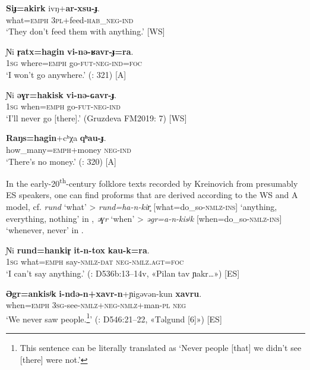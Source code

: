 \documentclass[output=paper,colorlinks,citecolor=brown]{langscibook}
\begin{document}
\ea\label{ex:niv:126}
    \gll \textbf{Siɟ=akirk} ivŋ+\textbf{ar-xsu-ɟ}. \\ 
         what=\textsc{emph} 3\textsc{pl}+feed-\textsc{hab\_neg{}-ind} \\
    \glt ‘They don’t feed them with anything.’ \citep[247]{Panfilov1965} [WS]
\z 

\ea\label{ex:niv:127}
    \gll Ɲi \textbf{r̥atx=hagin} \textbf{vi-nə{}-ʁavr-ɟ=ra}. \\ 
         \textsc{1sg} where=\textsc{emph} go-\textsc{fut-neg-ind=foc} \\
    \glt ‘I won’t go anywhere.’ (\citealt{SaveljevaTaksami1970}: 321) [A]
\z 

\ea\label{ex:niv:128}
    \gll Ɲi \textbf{əɣr=hakisk} \textbf{vi-nə-ɢavr-ɟ}. \\ 
         \textsc{1sg} when=\textsc{emph} go-\textsc{fut-neg-ind} \\
    \glt ‘I’ll never go [there].’ (Gruzdeva FM2019: 7) [WS]
\z 

\ea\label{ex:niv:129}
    \gll \textbf{Raŋs=hagin}+cʰχa \textbf{qʰau-ɟ}. \\ 
         how\_many=\textsc{emph}+money \textsc{neg-ind} \\
    \glt ‘There’s no money.’ (\citealt{SaveljevaTaksami1970}: 320) [A]
\z 


In the early-20\textsuperscript{th}{}-century folklore texts recorded by Kreinovich from presumably ES speakers, one can find proforms that are derived according to the WS and A model, cf. \textit{rund} ‘what’ > \textit{rund=ha-n-kir̥} [what=do\_so{}-\textsc{nmlz-ins}] ‘anything, everything, nothing’ in , \textit{əɣr} ‘when’ > \textit{əgr=a-n-kisʲk} [when=do\_so{}-\textsc{nmlz-ins}] ‘whenever, never’ in .

\ea\label{ex:niv:130}
    \gll Ɲi \textbf{rund=hankir̥} \textbf{it-n-tox} \textbf{kau-k=ra}. \\ 
         \textsc{1sg} what=\textsc{emph} say-\textsc{nmlz-dat} \textsc{neg-nmlz.agt=foc} \\
    \glt ‘I can’t say anything.’ (\cite{KreinovichMs}: D536b:13–14v, «Pilan tav ɲakr…») [ES]
\z 

\ea\label{ex:niv:131}
    \gll \textbf{Əgr=ankisʲk} \textbf{i-ndə-n+xavr-n}+ɲigəvən-kun \textbf{xavru}. \\ 
         when=\textsc{emph} \textsc{3sg}{}-see-\textsc{nmlz+neg-nmlz}+man-\textsc{pl} \textsc{neg} \\
    \glt ‘We never saw people.\footnote{This sentence can be literally translated as ‘Never people [that] we didn’t see [there] were not.’}’ (\cite{KreinovichMs}: D546:21–22, «Təlgund [6]») [ES]
\z
\end{document}

